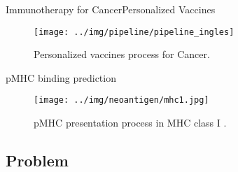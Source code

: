 \documentclass[10pt, aspectratio=169]{beamer}
\newcommand{\1}{
	\setbeamertemplate{background}{
		\texttt{[image: img/1]}
		\tikz[overlay] \fill[fill opacity=0.75,fill=white] (0,0) rectangle (-\paperwidth,\paperheight);
	}
}
\begin{document}
	\begin{frame}{Immunotherapy for Cancer}{Personalized Vaccines}	
		\begin{figure}
			\texttt{[image: ../img/pipeline/pipeline\_ingles]}
			\caption{Personalized vaccines process for Cancer.}
		\end{figure}		
	\end{frame}
	
	
	
	\begin{frame}{pMHC binding prediction}{}		
		\begin{figure}[H]
			\centering
			\texttt{[image: ../img/neoantigen/mhc1.jpg]}
			\caption{pMHC presentation process in MHC class I \cite{zhang2019application}.}
			\label{fig:mhc1}
		\end{figure}	
	\end{frame}
	
	\subsection{Problem}
	
\end{document}
